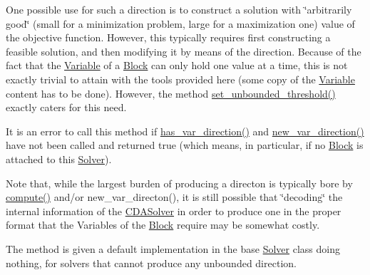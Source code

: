 One possible use for such a direction is to construct a solution with \char`\"{}arbitrarily good\char`\"{} (small for a minimization problem, large for a maximization one) value of the objective function. However, this typically requires first constructing a feasible solution, and then modifying it by means of the direction. Because of the fact that the \mbox{\hyperlink{class_s_m_spp__di__unipi__it_1_1_variable}{Variable}} of a \mbox{\hyperlink{class_s_m_spp__di__unipi__it_1_1_block}{Block}} can only hold one value at a time, this is not exactly trivial to attain with the tools provided here (some copy of the \mbox{\hyperlink{class_s_m_spp__di__unipi__it_1_1_variable}{Variable}} content has to be done). However, the method \mbox{\hyperlink{class_s_m_spp__di__unipi__it_1_1_solver_ae1717d1363782e086aa797e7437c0352}{set\+\_\+unbounded\+\_\+threshold()}} exactly caters for this need.

It is an error to call this method if \mbox{\hyperlink{class_s_m_spp__di__unipi__it_1_1_solver_a27e8c876f577289e523ebf26aeeb977a}{has\+\_\+var\+\_\+direction()}} and \mbox{\hyperlink{class_s_m_spp__di__unipi__it_1_1_solver_a673fc1c81a1fc86e55dfab3a37f303bc}{new\+\_\+var\+\_\+direction()}} have not been called and returned true (which means, in particular, if no \mbox{\hyperlink{class_s_m_spp__di__unipi__it_1_1_block}{Block}} is attached to this \mbox{\hyperlink{class_s_m_spp__di__unipi__it_1_1_solver}{Solver}}).

Note that, while the largest burden of producing a directon is typically bore by \mbox{\hyperlink{class_s_m_spp__di__unipi__it_1_1_solver_a504d4e3e174c7a518cc66156a8a45ce5}{compute()}} and/or new\+\_\+var\+\_\+directon(), it is still possible that \char`\"{}decoding\char`\"{} the internal information of the \mbox{\hyperlink{class_s_m_spp__di__unipi__it_1_1_c_d_a_solver}{C\+D\+A\+Solver}} in order to produce one in the proper format that the Variables of the \mbox{\hyperlink{class_s_m_spp__di__unipi__it_1_1_block}{Block}} require may be somewhat costly.

The method is given a default implementation in the base \mbox{\hyperlink{class_s_m_spp__di__unipi__it_1_1_solver}{Solver}} class doing nothing, for solvers that cannot produce any unbounded direction. \mbox{\label{class_s_m_spp__di__unipi__it_1_1_solver_a91d7cd0dc4fa453406ef30db2bfa37a5}} 
